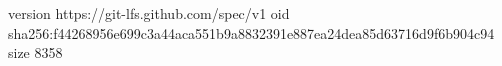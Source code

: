 version https://git-lfs.github.com/spec/v1
oid sha256:f44268956e699c3a44aca551b9a8832391e887ea24dea85d63716d9f6b904c94
size 8358
